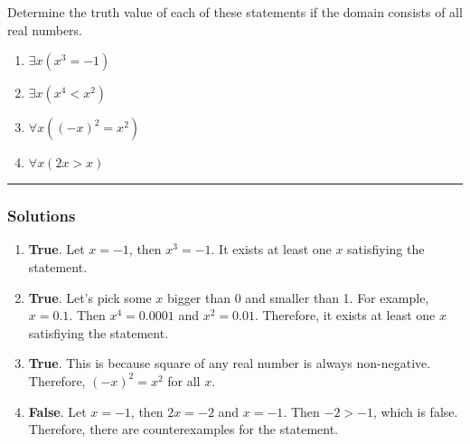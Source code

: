 \newpage
\begin{question}
Determine the truth value of each of these statements if the domain consists of all real numbers.
\begin{enumerate}
    \item \(\exists x(x^3 = -1)\)
    \item \(\exists x(x^4 < x^2)\)
    \item \(\forall x((-x)^2 = x^2)\)
    \item \(\forall x(2x > x)\)
\end{enumerate}
\end{question}

\par\noindent\rule{\textwidth}{0.5pt}

\subsubsection*{Solutions}
\begin{enumerate}
    \item \textbf{True}. Let $x = -1$, then $x^3 = -1$. It exists at least one $x$ satisfiying the statement.
    \item \textbf{True}. Let's pick some $x$ bigger than 0 and smaller than 1. For example, $x = 0.1$. Then $x^4 = 0.0001$ and $x^2 = 0.01$. Therefore, it exists at least one $x$ satisfiying the statement.
    \item \textbf{True}. This is because square of any real number is always non-negative. Therefore, $(-x)^2 = x^2$ for all $x$.
    \item \textbf{False}. Let $x = -1$, then $2x = -2$ and $x = -1$. Then $-2 > -1$, which is false. Therefore, there are counterexamples for the statement.
\end{enumerate}

